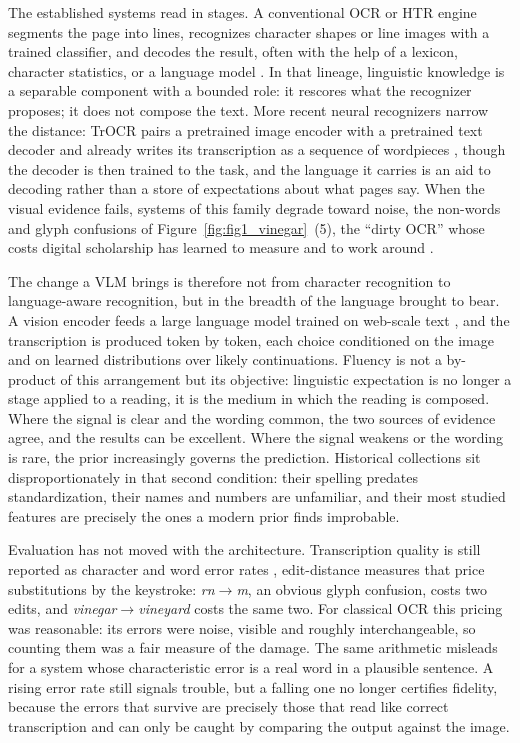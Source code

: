 \documentclass{anthology-ch}         %
\begin{document}
The established systems read in stages. A conventional OCR or HTR engine segments the page into lines, recognizes character shapes or line images with a trained classifier, and decodes the result, often with the help of a lexicon, character statistics, or a language model \cite{smith_research_2018}. In that lineage, linguistic knowledge is a separable component with a bounded role: it rescores what the recognizer proposes; it does not compose the text. More recent neural recognizers narrow the distance: TrOCR pairs a pretrained image encoder with a pretrained text decoder and already writes its transcription as a sequence of wordpieces \cite{li_trocr_2022}, though the decoder is then trained to the task, and the language it carries is an aid to decoding rather than a store of expectations about what pages say. When the visual evidence fails, systems of this family degrade toward noise, the non-words and glyph confusions of Figure~\ref{fig:fig1_vinegar}~(5), the ``dirty OCR'' whose costs digital scholarship has learned to measure and to work around \cite{traub_impact_2015, alpert-abrams_machine_2016, cordell_q_2017, hill_quantifying_2019}.

The change a VLM brings is therefore not from character recognition to language-aware recognition, but in the breadth of the language brought to bear. A vision encoder feeds a large language model trained on web-scale text \cite{liu_visual_2023}, and the transcription is produced token by token, each choice conditioned on the image and on learned distributions over likely continuations. Fluency is not a by-product of this arrangement but its objective: linguistic expectation is no longer a stage applied to a reading, it is the medium in which the reading is composed. Where the signal is clear and the wording common, the two sources of evidence agree, and the results can be excellent. Where the signal weakens or the wording is rare, the prior increasingly governs the prediction. Historical collections sit disproportionately in that second condition: their spelling predates standardization, their names and numbers are unfamiliar, and their most studied features are precisely the ones a modern prior finds improbable.

Evaluation has not moved with the architecture. Transcription quality is still reported as character and word error rates \cite{neudecker_survey_2021}, edit-distance measures \cite{levenshtein_binary_1966} that price substitutions by the keystroke: \emph{rn}$\rightarrow$\emph{m}, an obvious glyph confusion, costs two edits, and \emph{vinegar}$\rightarrow$\emph{vineyard} costs the same two. For classical OCR this pricing was reasonable: its errors were noise, visible and roughly interchangeable, so counting them was a fair measure of the damage. The same arithmetic misleads for a system whose characteristic error is a real word in a plausible sentence. A rising error rate still signals trouble, but a falling one no longer certifies fidelity, because the errors that survive are precisely those that read like correct transcription and can only be caught by comparing the output against the image.
\end{document}
